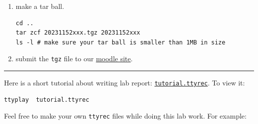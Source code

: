 \documentclass{article}
\begin{document}
\begin{itemize}
\begin{enumerate}
\begin{verbatim}
mkdir 20231152xxx       # create a new directory
cd 20231152xxx
vim tcpServer.c         # Implement the TCP server in C
vim tcpClient.c         # Implement the TCP client in C
# compile and run above C programs successfully, and then

# do the HTTP demo
vim tmux-http.sh 

# record a screencase using ttyrec (in a plain terminal without tmux)
ttyrec -f http-demo.ttyrec -- tmux new
# play screencast
ttyplay http-demo.ttyrec 

# make sure you successfully finished all the above, then
# write your report
vim 20231152xxx.yaml  # write a yaml file, and
vim 20231152xxx.md    # your report in markdown format

# generate the PDFs from the above yaml and md files 
# (make sure you have the Makefile ready)
make report_pdf
make journal_pdf

# in case you prefer emacs to vi
emacs 20231152xxx.org # report in emacs-org format
# in emacs type C-c C-e l p to generate a PDF
\end{verbatim}

\item make a tar ball.
\begin{verbatim}
cd ..                                                      
tar zcf 20231152xxx.tgz 20231152xxx                        
ls -l # make sure your tar ball is smaller than 1MB in size
\end{verbatim}

\item submit the \texttt{tgz} file to our \href{https://cs6.swfu.edu.cn/moodle/mod/assign/view.php?id=885}{moodle site}.
\end{enumerate}

\noindent\rule{\textwidth}{0.5pt}
\end{itemize}

Here is a short tutorial about writing lab report: \href{tutorial.ttyrec}{\texttt{tutorial.ttyrec}}. To view it:

\begin{verbatim}
ttyplay  tutorial.ttyrec
\end{verbatim}

Feel free to make your own \texttt{ttyrec} files while doing this lab work. For example:
\end{document}
